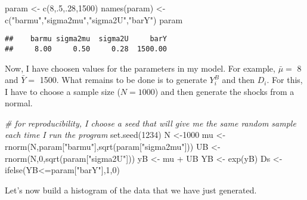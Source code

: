 \documentclass[
]{book}
\newenvironment{Shaded}{\begin{snugshade}}{\end{snugshade}}
\newcommand{\CommentTok}[1]{\textcolor[rgb]{0.56,0.35,0.01}{\textit{#1}}}
\newcommand{\DecValTok}[1]{\textcolor[rgb]{0.00,0.00,0.81}{#1}}
\newcommand{\FunctionTok}[1]{\textcolor[rgb]{0.00,0.00,0.00}{#1}}
\newcommand{\NormalTok}[1]{#1}
\newcommand{\OtherTok}[1]{\textcolor[rgb]{0.56,0.35,0.01}{#1}}
\newcommand{\SpecialCharTok}[1]{\textcolor[rgb]{0.00,0.00,0.00}{#1}}
\newcommand{\StringTok}[1]{\textcolor[rgb]{0.31,0.60,0.02}{#1}}
\theoremstyle{definition}
\theoremstyle{definition}
\theoremstyle{definition}
\theoremstyle{definition}
\theoremstyle{remark}
\begin{document}
\begin{Shaded}
\begin{Highlighting}[]
\NormalTok{param }\OtherTok{\textless{}{-}} \FunctionTok{c}\NormalTok{(}\DecValTok{8}\NormalTok{,.}\DecValTok{5}\NormalTok{,.}\DecValTok{28}\NormalTok{,}\DecValTok{1500}\NormalTok{)}
\FunctionTok{names}\NormalTok{(param) }\OtherTok{\textless{}{-}} \FunctionTok{c}\NormalTok{(}\StringTok{"barmu"}\NormalTok{,}\StringTok{"sigma2mu"}\NormalTok{,}\StringTok{"sigma2U"}\NormalTok{,}\StringTok{"barY"}\NormalTok{)}
\NormalTok{param}
\end{Highlighting}
\end{Shaded}

\begin{verbatim}
##    barmu sigma2mu  sigma2U     barY 
##     8.00     0.50     0.28  1500.00
\end{verbatim}

Now, I have choosen values for the parameters in my model.
For example, \(\bar{\mu}=\) 8 and \(\bar{Y}=\) 1500.
What remains to be done is to generate \(Y_i^B\) and then \(D_i\).
For this, I have to choose a sample size (\(N=1000\)) and then generate the shocks from a normal.

\begin{Shaded}
\begin{Highlighting}[]
\CommentTok{\# for reproducibility, I choose a seed that will give me the same random sample each time I run the program}
\FunctionTok{set.seed}\NormalTok{(}\DecValTok{1234}\NormalTok{)}
\NormalTok{N }\OtherTok{\textless{}{-}}\DecValTok{1000}
\NormalTok{mu }\OtherTok{\textless{}{-}} \FunctionTok{rnorm}\NormalTok{(N,param[}\StringTok{"barmu"}\NormalTok{],}\FunctionTok{sqrt}\NormalTok{(param[}\StringTok{"sigma2mu"}\NormalTok{]))}
\NormalTok{UB }\OtherTok{\textless{}{-}} \FunctionTok{rnorm}\NormalTok{(N,}\DecValTok{0}\NormalTok{,}\FunctionTok{sqrt}\NormalTok{(param[}\StringTok{"sigma2U"}\NormalTok{]))}
\NormalTok{yB }\OtherTok{\textless{}{-}}\NormalTok{ mu }\SpecialCharTok{+}\NormalTok{ UB }
\NormalTok{YB }\OtherTok{\textless{}{-}} \FunctionTok{exp}\NormalTok{(yB)}
\NormalTok{Ds }\OtherTok{\textless{}{-}} \FunctionTok{ifelse}\NormalTok{(YB}\SpecialCharTok{\textless{}=}\NormalTok{param[}\StringTok{"barY"}\NormalTok{],}\DecValTok{1}\NormalTok{,}\DecValTok{0}\NormalTok{) }
\end{Highlighting}
\end{Shaded}

Let's now build a histogram of the data that we have just generated.
\end{document}
